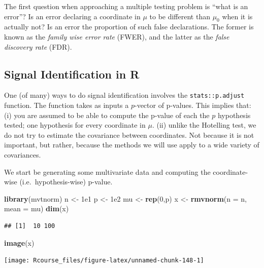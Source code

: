 \documentclass[]{book}
\newenvironment{Shaded}{\begin{snugshade}}{\end{snugshade}}
\newcommand{\KeywordTok}[1]{\textcolor[rgb]{0.13,0.29,0.53}{\textbf{{#1}}}}
\newcommand{\DataTypeTok}[1]{\textcolor[rgb]{0.13,0.29,0.53}{{#1}}}
\newcommand{\DecValTok}[1]{\textcolor[rgb]{0.00,0.00,0.81}{{#1}}}
\newcommand{\FloatTok}[1]{\textcolor[rgb]{0.00,0.00,0.81}{{#1}}}
\newcommand{\StringTok}[1]{\textcolor[rgb]{0.31,0.60,0.02}{{#1}}}
\newcommand{\NormalTok}[1]{{#1}}
\theoremstyle{definition}
\theoremstyle{definition}
\theoremstyle{remark}
\begin{document}
The first question when approaching a multiple testing problem is ``what
is an error''? Is an error declaring a coordinate in \(\mu\) to be
different than \(\mu_0\) when it is actually not? Is an error the
proportion of such false declarations. The former is known as the
\emph{family wise error rate} (FWER), and the latter as the \emph{false
discovery rate} (FDR).

\subsection{Signal Identification in
R}\label{signal-identification-in-r}

One (of many) ways to do signal identification involves the
\texttt{stats::p.adjust} function. The function takes as inputs a
\(p\)-vector of p-values. This implies that: (i) you are assumed to be
able to compute the p-value of each the \(p\) hypothesis tested; one
hypothesis for every coordinate in \(\mu\). (ii) unlike the Hotelling
test, we do not try to estimate the covariance between coordinates. Not
because it is not important, but rather, because the methods we will use
apply to a wide variety of covariances.

We start be generating some multivariate data and computing the
coordinate-wise (i.e.~hypothesis-wise) p-value.

\begin{Shaded}
\begin{Highlighting}[]
\KeywordTok{library}\NormalTok{(mvtnorm)}
\NormalTok{n <-}\StringTok{ }\FloatTok{1e1}
\NormalTok{p <-}\StringTok{ }\FloatTok{1e2}
\NormalTok{mu <-}\StringTok{ }\KeywordTok{rep}\NormalTok{(}\DecValTok{0}\NormalTok{,p)}
\NormalTok{x <-}\StringTok{ }\KeywordTok{rmvnorm}\NormalTok{(}\DataTypeTok{n =} \NormalTok{n, }\DataTypeTok{mean =} \NormalTok{mu)}
\KeywordTok{dim}\NormalTok{(x)}
\end{Highlighting}
\end{Shaded}

\begin{verbatim}
## [1]  10 100
\end{verbatim}

\begin{Shaded}
\begin{Highlighting}[]
\KeywordTok{image}\NormalTok{(x)}
\end{Highlighting}
\end{Shaded}

\texttt{[image: Rcourse\_files/figure-latex/unnamed-chunk-148-1]}
\end{document}
